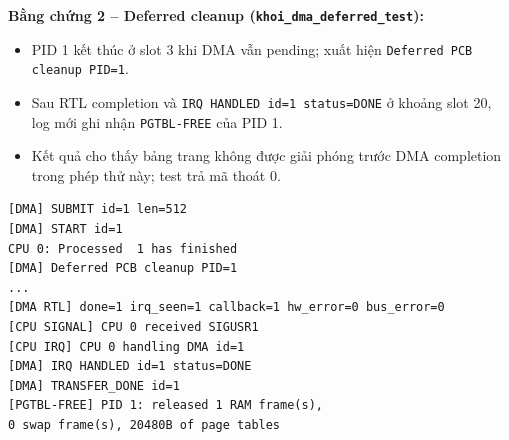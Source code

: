 \documentclass[12pt,a4paper]{article}
\begin{document}
	\noindent\textbf{Bằng chứng 2 -- Deferred cleanup (\texttt{khoi\_dma\_deferred\_test}):}
	\begin{itemize}
	    \item PID 1 kết thúc ở slot 3 khi DMA vẫn pending; xuất hiện \texttt{Deferred PCB cleanup PID=1}.
	    \item Sau RTL completion và \texttt{IRQ HANDLED id=1 status=DONE} ở khoảng slot 20, log mới ghi nhận \texttt{PGTBL-FREE} của PID 1.
	    \item Kết quả cho thấy bảng trang không được giải phóng trước DMA completion trong phép thử này; test trả mã thoát 0.
	\end{itemize}

    
\begin{lstlisting}[basicstyle=\ttfamily\footnotesize]
[DMA] SUBMIT id=1 len=512
[DMA] START id=1
CPU 0: Processed  1 has finished
[DMA] Deferred PCB cleanup PID=1
...
[DMA RTL] done=1 irq_seen=1 callback=1 hw_error=0 bus_error=0
[CPU SIGNAL] CPU 0 received SIGUSR1
[CPU IRQ] CPU 0 handling DMA id=1
[DMA] IRQ HANDLED id=1 status=DONE
[DMA] TRANSFER_DONE id=1
[PGTBL-FREE] PID 1: released 1 RAM frame(s),
0 swap frame(s), 20480B of page tables
\end{lstlisting}
  
\end{document}
